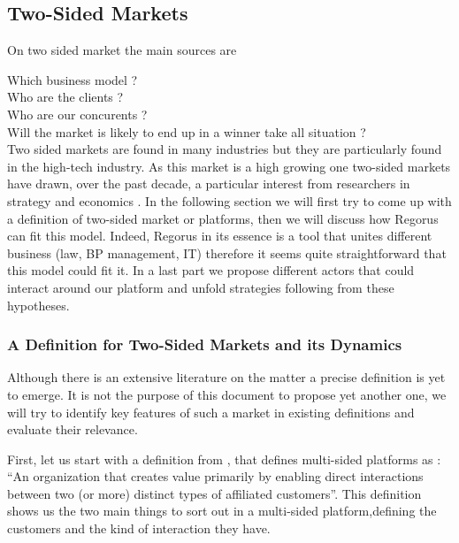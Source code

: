 \documentclass[10pt]{report}
\begin{document}
\subsection{Two-Sided Markets}
On two sided market the main sources are \autocite{ParkerA05} \autocite{eisenmann2006strategies} \autocite{rochet2003platform} \autocite{Hagiu2011} \autocite{economides2006}

Which business model ?\\
Who are the clients ?\\
Who are our concurents ?\\

Will the market is likely to end up in a winner take all situation ?\\

Two sided markets are found in many industries but they are particularly found in the high-tech industry. As this market is a high growing one two-sided markets have drawn, over the past decade, a particular interest from researchers in strategy and economics \autocite{Hagiu2011}. In the following section we will first try to come up with a definition of two-sided market or platforms, then we will discuss how Regorus can fit this model. Indeed, Regorus in its essence is a tool that unites different business (law, BP management, IT) therefore it seems quite straightforward that this model could fit it. In a last part we propose different actors that could interact around our platform and unfold strategies following from these hypotheses.

\subsubsection{A Definition for Two-Sided Markets and its Dynamics}

Although there is an extensive literature on the matter a precise definition is yet to emerge. It is not the purpose of this document to propose yet another one, we will try to identify key features of such a market in existing definitions and evaluate their relevance.

First, let us start with a definition from \autocite{Hagiu2011}, that defines multi-sided platforms as : \enquote{An organization that creates value primarily by enabling direct interactions between two (or more) distinct types of affiliated customers}. This definition shows us the two main things to sort out in a multi-sided platform,defining the customers and the kind of interaction they have. 
\end{document}
